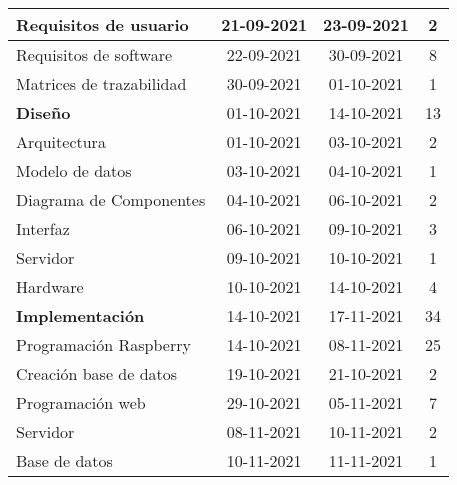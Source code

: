 \begin{longtable}[c]{lcc|c|}
	\multicolumn{1}{|l|}{Requisitos de usuario}              & \multicolumn{1}{c|}{21-09-2021} & 23-09-2021     & 2   \\ \hline
	\multicolumn{1}{|l|}{Requisitos de software}             & \multicolumn{1}{c|}{22-09-2021} & 30-09-2021     & 8   \\ \hline
	\multicolumn{1}{|l|}{Matrices de trazabilidad}           & \multicolumn{1}{c|}{30-09-2021} & 01-10-2021     & 1   \\ \hline
	\multicolumn{1}{|l|}{\textbf{Diseño}}                    & \multicolumn{1}{c|}{01-10-2021} & 14-10-2021     & 13  \\ \hline
	\multicolumn{1}{|l|}{Arquitectura}                       & \multicolumn{1}{c|}{01-10-2021} & 03-10-2021     & 2   \\ \hline
	\multicolumn{1}{|l|}{Modelo de datos}                    & \multicolumn{1}{c|}{03-10-2021} & 04-10-2021     & 1   \\ \hline
	\multicolumn{1}{|l|}{Diagrama de Componentes}            & \multicolumn{1}{c|}{04-10-2021} & 06-10-2021     & 2   \\ \hline
	\multicolumn{1}{|l|}{Interfaz}                           & \multicolumn{1}{c|}{06-10-2021} & 09-10-2021     & 3   \\ \hline
	\multicolumn{1}{|l|}{Servidor}                           & \multicolumn{1}{c|}{09-10-2021} & 10-10-2021     & 1   \\ \hline
	\multicolumn{1}{|l|}{Hardware}                           & \multicolumn{1}{c|}{10-10-2021} & 14-10-2021     & 4   \\ \hline
	\multicolumn{1}{|l|}{\textbf{Implementación}}            & \multicolumn{1}{c|}{14-10-2021} & 17-11-2021     & 34  \\ \hline
	\multicolumn{1}{|l|}{Programación Raspberry}             & \multicolumn{1}{c|}{14-10-2021} & 08-11-2021     & 25  \\ \hline
	\multicolumn{1}{|l|}{Creación base de datos}             & \multicolumn{1}{c|}{19-10-2021} & 21-10-2021     & 2   \\ \hline
	\multicolumn{1}{|l|}{Programación web}                   & \multicolumn{1}{c|}{29-10-2021} & 05-11-2021     & 7   \\ \hline
	\multicolumn{1}{|l|}{Servidor}                           & \multicolumn{1}{c|}{08-11-2021} & 10-11-2021     & 2   \\ \hline
	\multicolumn{1}{|l|}{Base de datos}                      & \multicolumn{1}{c|}{10-11-2021} & 11-11-2021     & 1   \\ \hline

\end{longtable}
